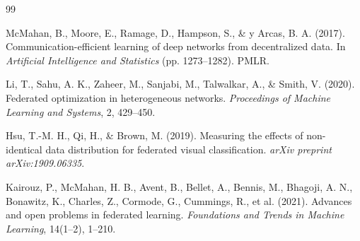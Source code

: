 \documentclass[11pt,a4paper]{article}
\begin{document}
\begin{thebibliography}{99}

McMahan, B., Moore, E., Ramage, D., Hampson, S., \& y Arcas, B. A. (2017).
Communication-efficient learning of deep networks from decentralized data.
In \textit{Artificial Intelligence and Statistics} (pp. 1273--1282). PMLR.

Li, T., Sahu, A. K., Zaheer, M., Sanjabi, M., Talwalkar, A., \& Smith, V. (2020).
Federated optimization in heterogeneous networks.
\textit{Proceedings of Machine Learning and Systems}, 2, 429--450.

Hsu, T.-M. H., Qi, H., \& Brown, M. (2019).
Measuring the effects of non-identical data distribution for federated visual classification.
\textit{arXiv preprint arXiv:1909.06335}.

Kairouz, P., McMahan, H. B., Avent, B., Bellet, A., Bennis, M., Bhagoji, A. N., Bonawitz, K., Charles, Z., Cormode, G., Cummings, R., et al. (2021).
Advances and open problems in federated learning.
\textit{Foundations and Trends in Machine Learning}, 14(1--2), 1--210.

\end{thebibliography}
\end{document}
